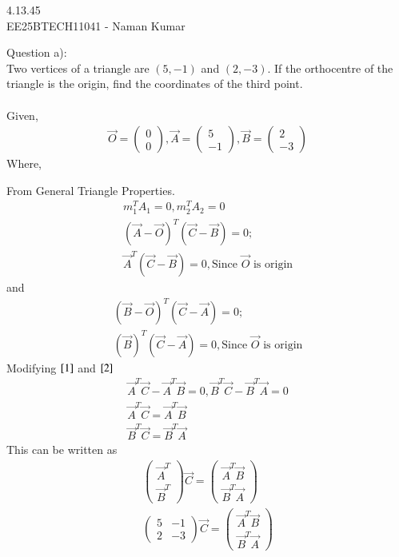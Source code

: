 \documentclass[journal]{IEEEtran}
\author{EE25BTECH11041-Naman Kumar }
\begin{document}
\begin{center}
    \huge{4.13.45}\\
    \large{EE25BTECH11041 - Naman Kumar}
\end{center}
Question a):\\
Two vertices of a triangle are $(5, -1)$ and $(2, -3)$. If the orthocentre of the triangle
is the origin, find the coordinates of the third point.\\
\solution \\
Given,
\begin{align}
\vec{O}=\begin{pmatrix}0\\0\end{pmatrix},\vec{A}=\begin{pmatrix}5\\-1\end{pmatrix},\vec{B}=\begin{pmatrix}2\\-3\end{pmatrix}
\end{align}
Where,

From General Triangle Properties.
\begin{align}
    m_1^{T}A_1=0,m_2^{T}A_2=0\\
    (\vec{A}-\vec{O})^{T}(\vec{C}-\vec{B})=0;\\
    \vec{A}^{T}(\vec{C}-\vec{B})=0, \label{1}\text{Since $\vec{O}$ is origin}
\end{align}
and 
\begin{align}
    (\vec{B}-\vec{O})^{T}(\vec{C}-\vec{A})=0;\\
    (\vec{B})^{T}(\vec{C}-\vec{A})=0,\label{2}\text{Since $\vec{O}$ is origin}
\end{align}
Modifying $\eqref{1}$ and $\eqref{2}$
\begin{align}
\vec{A}^T\vec{C}-\vec{A}^T\vec{B}=0,\vec{B}^T\vec{C}-\vec{B}^T\vec{A}=0\\
\vec{A}^T\vec{C}=\vec{A}^T\vec{B} \label{3}\\ \vec{B}^T\vec{C}=\vec{B}^T\vec{A} \label{4}
\end{align}
This can be written as
\begin{align}
    \begin{pmatrix}\vec{A}^T \\ \vec{B}^T \end{pmatrix}\vec{C}=\begin{pmatrix}\vec{A}^T\vec{B}\\ \vec{B}^T\vec{A} \end{pmatrix}\\
    \begin{pmatrix}5 & -1\\ 2 & -3\end{pmatrix}\vec{C}=\begin{pmatrix}\vec{A}^T\vec{B}\\ \vec{B}^T\vec{A} \end{pmatrix} \label{5}
\end{align}
\end{document}
